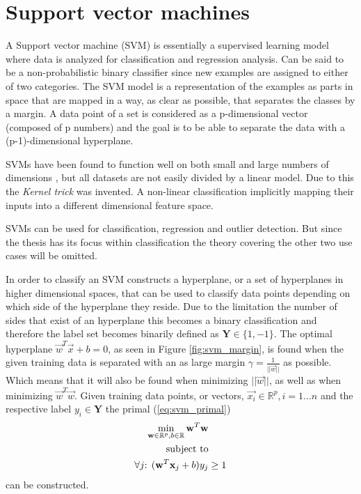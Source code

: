 \section{Support vector machines}
\label{sec:mltheory:svm}

A Support vector machine (SVM) is essentially a supervised learning model where data is analyzed for classification and regression analysis. Can be said to be a non-probabilistic binary classifier since new examples are assigned to either of two categories. The SVM model is a representation of the examples as parts in space that are mapped in a way, as clear as possible, that separates the classes by a margin. A data point of a set is considered as a p-dimensional vector (composed of p numbers) and the goal is to be able to separate the data with a (p-1)-dimensional hyperplane. 

SVMs have been found to function well on both small and large numbers of dimensions \cite{vert2005kernel}, but all datasets are not easily divided by a linear model.  Due to this the \emph{Kernel trick} was invented. A non-linear classification implicitly mapping their inputs into a different dimensional feature space.

SVMs can be used for classification, regression and outlier detection. But since the thesis has its focus within classification the theory covering the other two use cases will be omitted. 

In order to classify an SVM constructs a hyperplane, or a set of hyperplanes in higher dimensional spaces, that can be used to classify data points depending on which side of the hyperplane they reside. Due to the limitation the number of sides that exist of an hyperplane this becomes a binary classification and therefore the label set becomes binarily defined as $\mathbf{Y} \in \{1,-1\}$. The optimal hyperplane $\vec{w}^T\vec{x}+b = 0$, as seen in Figure \ref{fig:svm_margin}, is found when the given training data is separated with an as large margin $\gamma = \frac{1}{||{\vec{w}||}}$ as possible. Which means that it will also be found when minimizing $||\vec{w}||$, as well as when minimizing $\vec{w}^T\vec{w}$. 
Given training data points, or vectors, $\vec{x_i} \in \mathbb{R}^p, i=1...n$ and the respective label $y_i \in \mathbf{Y}$ the primal (\ref{eq:svm_primal})
\begin{equation}
\label{eq:svm_primal}
\begin{split}
\min_{\vec{w}\in\mathbb{R}^p,b\in\mathbb{R}}{\vec{w}^T\vec{w}}& \\
\textnormal{subject to} & \\
\forall j\textnormal{: } (\vec{w}^T\vec{x}_j + b)y_j & \geq 1
\end{split}
\end{equation}
can be constructed.

